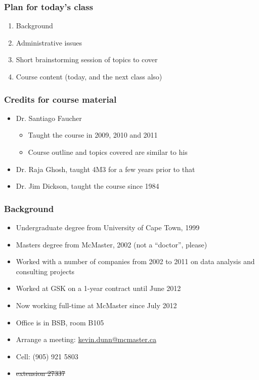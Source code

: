 
\begin{frame}\frametitle{Plan for today's class}
	\begin{enumerate}
		\item	Background
		\item	Administrative issues
		\item	Short brainstorming session of topics to cover
		\item	Course content (today, and the next class also)
	\end{enumerate}
\end{frame}

\begin{frame}\frametitle{Credits for course material}
	
	\begin{itemize}
		\item	Dr. Santiago Faucher
		\begin{itemize}
			\item	Taught the course in 2009, 2010 and 2011
			\item	Course outline and topics covered are similar to his
		\end{itemize}
		\item	Dr. Raja Ghosh, taught 4M3 for a few years prior to that
		\item	Dr. Jim Dickson, taught the course since 1984
	\end{itemize}	
\end{frame}

\begin{frame}\frametitle{Background}
	{\color{myGreen}{About myself}}
	\begin{itemize}
		\item	Undergraduate degree from University of Cape Town, 1999
		\item	Masters degree from McMaster, 2002 (not a ``doctor'', please)
		\item	Worked with a number of companies from 2002 to 2011 on data analysis and consulting projects
		\item	Worked at GSK on a 1-year contract until June 2012		
		\item	Now working full-time at McMaster since July 2012
		\item	Office is in BSB, room B105
		\item	Arrange a meeting: \url{kevin.dunn@mcmaster.ca}
		\item	Cell: (905) 921 5803
		\item	\sout{extension 27337}
	\end{itemize}	
\end{frame}

